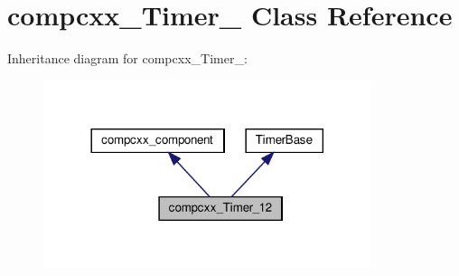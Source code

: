 \hypertarget{classcompcxx__Timer__12}{}\section{compcxx\+\_\+\+Timer\+\_ Class Reference}
\label{classcompcxx__Timer__12}


Inheritance diagram for compcxx\+\_\+\+Timer\+\_\+:\nopagebreak
\begin{figure}[H]
\begin{center}
\leavevmode
\includegraphics[width=272pt]{classcompcxx__Timer__12__inherit__graph}
\end{center}
\end{figure}


